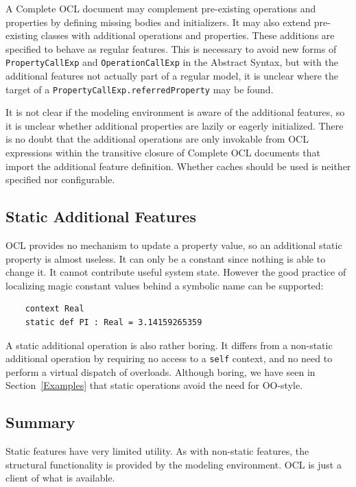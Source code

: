 \documentclass[sigconf]{acmart}
\begin{document}
A Complete OCL document may complement pre-existing operations and properties by defining missing bodies and initializers. It may also extend pre-existing classes with additional operations and properties. These additions are specified to behave as regular features. This is necessary to avoid new forms of \verb|PropertyCallExp| and \verb|OperationCallExp| in the Abstract Syntax, but with the additional features not actually part of a regular model, it is unclear where the target of a \verb|PropertyCallExp.referredProperty| may be found.

It is not clear if the modeling environment is aware of the additional features, so it is unclear whether additional properties are lazily or eagerly initialized. There is no doubt that the additional operations are only invokable from OCL expressions within the transitive closure of Complete OCL documents that import the additional feature definition. Whether caches should be used is neither specified nor configurable.

\subsection{Static Additional Features}

OCL provides no mechanism to update a property value, so an additional static property is almost useless. It can only be a constant since nothing is able to change it. It cannot contribute useful system state. However the good practice of localizing magic constant values behind a symbolic name can be supported:

\begin{verbatim}
	context Real
	static def PI : Real = 3.14159265359
\end{verbatim} 

A static additional operation is also rather boring. It differs from a non-static additional operation by requiring no access to a \verb|self| context, and no need to perform a virtual dispatch of overloads. Although boring, we have seen in Section~\ref{Examples} that static operations avoid the need for OO-style.

\subsection{Summary}

Static features have very limited utility. As with non-static features, the structural functionality is provided by the modeling environment. OCL is just a client of what is available.
\end{document}

